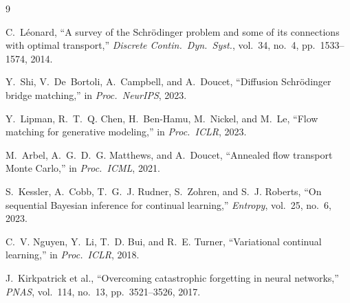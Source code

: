 \documentclass[11pt]{article}
\theoremstyle{definition}
\theoremstyle{plain}
\theoremstyle{remark}
\begin{document}
\begin{thebibliography}{9}

C.~L\'eonard, ``A survey of the Schr\"odinger problem and some of its connections
with optimal transport,'' \emph{Discrete Contin.\ Dyn.\ Syst.}, vol.~34, no.~4,
pp.~1533--1574, 2014.

Y.~Shi, V.~De~Bortoli, A.~Campbell, and A.~Doucet, ``Diffusion Schr\"odinger
bridge matching,'' in \emph{Proc.\ NeurIPS}, 2023.

Y.~Lipman, R.~T.~Q. Chen, H.~Ben-Hamu, M.~Nickel, and M.~Le, ``Flow matching for
generative modeling,'' in \emph{Proc.\ ICLR}, 2023.

M.~Arbel, A.~G.~D.~G. Matthews, and A.~Doucet, ``Annealed flow transport Monte
Carlo,'' in \emph{Proc.\ ICML}, 2021.

S.~Kessler, A.~Cobb, T.~G.~J. Rudner, S.~Zohren, and S.~J. Roberts, ``On
sequential Bayesian inference for continual learning,'' \emph{Entropy}, vol.~25,
no.~6, 2023.

C.~V. Nguyen, Y.~Li, T.~D. Bui, and R.~E. Turner, ``Variational continual
learning,'' in \emph{Proc.\ ICLR}, 2018.

J.~Kirkpatrick et al., ``Overcoming catastrophic forgetting in neural networks,''
\emph{PNAS}, vol.~114, no.~13, pp.~3521--3526, 2017.

\end{thebibliography}
\end{document}
